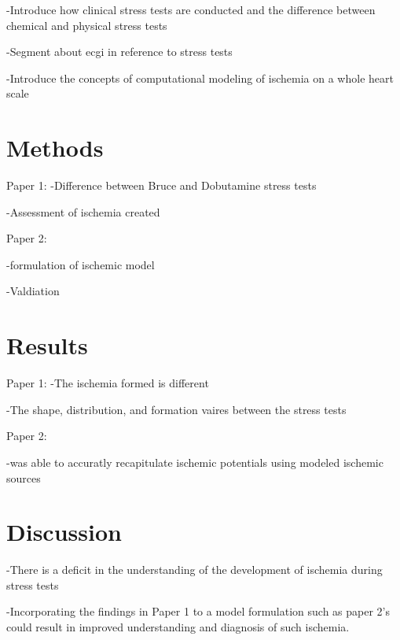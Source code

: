 \documentclass[12pt]{article}
\begin{document}
-Introduce how clinical stress tests are conducted and the difference between chemical and physical stress tests

-Segment about ecgi in reference to stress tests

-Introduce the concepts of computational modeling of ischemia on a whole heart scale


\section{Methods}
Paper 1:\cite{Zenger2019}
-Difference between Bruce and Dobutamine stress tests

-Assessment of ischemia created

Paper 2:\cite{Burton2018}

-formulation of ischemic model

-Valdiation


\section{Results}
Paper 1:
-The ischemia formed is different

-The shape, distribution, and formation vaires between the stress tests

Paper 2:

-was able to accuratly recapitulate ischemic potentials using modeled ischemic sources


\section{Discussion}

-There is a deficit in the understanding of the development of ischemia during stress tests

-Incorporating the findings in Paper 1 to a model formulation such as paper 2's could result in improved understanding and diagnosis of such ischemia.




\end{document}
